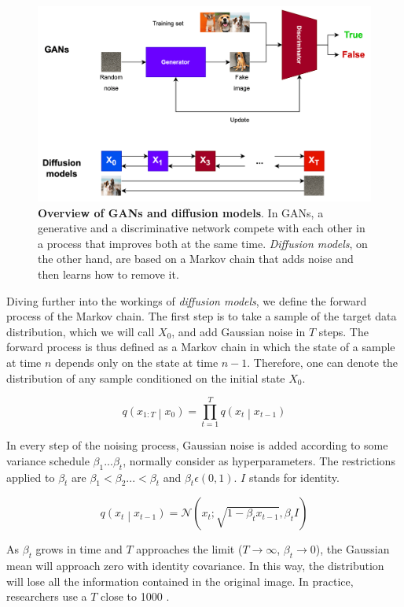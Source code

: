 \begin{figure}
    \centering
    \includegraphics[width=1\textwidth]{Pictures/GansvsDM} 
    \caption{\textbf{Overview of GANs and diffusion models}. In GANs, a generative and a discriminative network compete with each other in a process that improves both at the same time. \textit{Diffusion models}, on the other hand, are based on a Markov chain that adds noise and then learns how to remove it.}
    \label{fig:GansvsDM}
\end{figure}

Diving further into the workings of \textit{diffusion models}, we define the forward process of the Markov chain. The first step is to take a sample of the target data distribution, which we will call $X_0$, and add Gaussian noise in $T$ steps. The forward process is thus defined as a Markov chain in which the state of a sample at time $n$ depends only on the state at time $n-1$. Therefore, one can denote the distribution of any sample conditioned on the initial state $X_0$.

\[ q\left(x_{1:T}\middle| x_0\right)=\prod_{t=1}^{T}{q\left(x_t\middle| x_{t-1}\right)} \]

In every step of the noising process, Gaussian noise is added according to some variance schedule $\beta_1...\beta_t$, normally consider as hyperparameters. The restrictions applied to $\beta_t$ are $\beta_1 < \beta_2 ... < \beta_t$ and $\beta_t \epsilon (0, 1)$. $I$ stands for identity.

\[q\left(x_t\middle| x_{t-1}\right)=\mathcal{N}\left(x_t;\sqrt{1-\beta_tx_{t-1}},\beta_tI\right) \]

As $\beta_t$ grows in time and $T$ approaches the limit ($T \rightarrow\infty$, $\beta_t \rightarrow 0$), the Gaussian mean will approach zero with identity covariance. In this way, the distribution will lose all the information contained in the original image. In practice, researchers use a $T$ close to 1000 \cite{ho2020denoising}.

